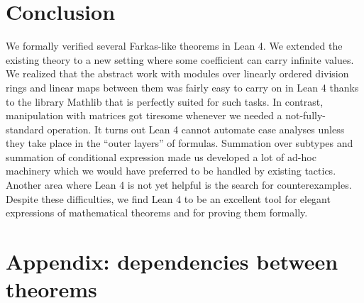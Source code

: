 \documentclass[]{article}
\renewcommand{\.}{\hskip .75pt}
\begin{document}
\section {Conclusion}

We formally verified several Farkas-like theorems in Lean 4.
We extended the existing theory to a new setting where some
coefficient can carry infinite values. We realized that the
abstract work with modules over linearly ordered division rings
and linear maps between them was fairly easy to carry on in
Lean 4 thanks to the library Mathlib that is perfectly suited
for such tasks. In contrast, manipulation with matrices got
tiresome whenever we needed a not-fully-standard operation.
It turns out Lean 4 cannot automate case analyses unless they
take place in the ``outer layers'' of formulas. Summation
over subtypes and summation of conditional expression made
us developed a lot of ad-hoc machinery which we would have
preferred to be handled by existing tactics. Another area
where Lean 4 is not yet helpful is the search for counterexamples.
Despite these difficulties, we find Lean 4 to be an excellent
tool for elegant expressions of mathematical theorems and
for proving them formally.







%

\section{Appendix: dependencies between theorems}
\end{document}
